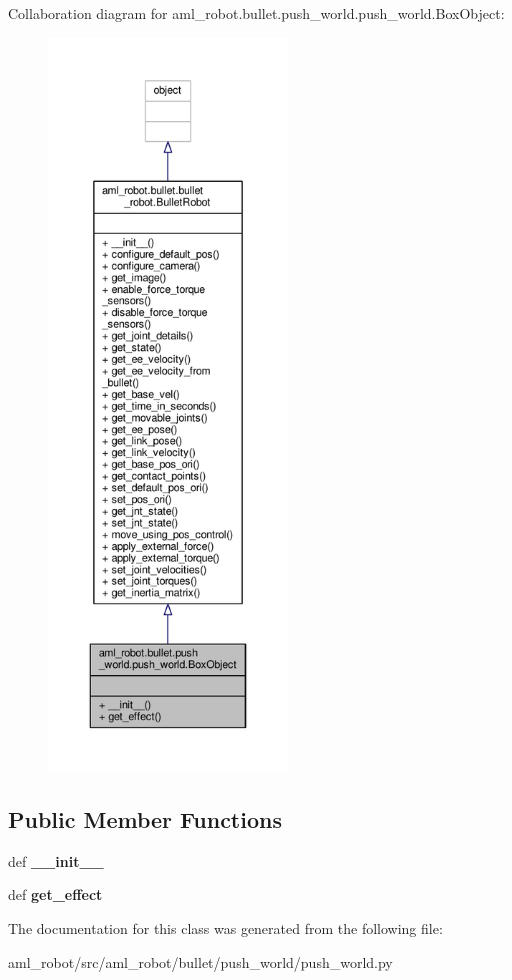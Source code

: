 Collaboration diagram for aml\-\_\-robot.\-bullet.\-push\-\_\-world.\-push\-\_\-world.\-Box\-Object\-:
\nopagebreak
\begin{figure}[H]
\begin{center}
\leavevmode
\includegraphics[height=550pt]{classaml__robot_1_1bullet_1_1push__world_1_1push__world_1_1_box_object__coll__graph}
\end{center}
\end{figure}
\subsection*{Public Member Functions}
\begin{DoxyCompactItemize}
\item 
\hypertarget{classaml__robot_1_1bullet_1_1push__world_1_1push__world_1_1_box_object_a56b5453d71cae48208e50ff49a555d7a}{def {\bfseries \-\_\-\-\_\-init\-\_\-\-\_\-}}\label{classaml__robot_1_1bullet_1_1push__world_1_1push__world_1_1_box_object_a56b5453d71cae48208e50ff49a555d7a}

\item 
\hypertarget{classaml__robot_1_1bullet_1_1push__world_1_1push__world_1_1_box_object_a8288813cc6065a361e6507c9540ed268}{def {\bfseries get\-\_\-effect}}\label{classaml__robot_1_1bullet_1_1push__world_1_1push__world_1_1_box_object_a8288813cc6065a361e6507c9540ed268}

\end{DoxyCompactItemize}


The documentation for this class was generated from the following file\-:\begin{DoxyCompactItemize}
\item 
aml\-\_\-robot/src/aml\-\_\-robot/bullet/push\-\_\-world/push\-\_\-world.\-py\end{DoxyCompactItemize}
